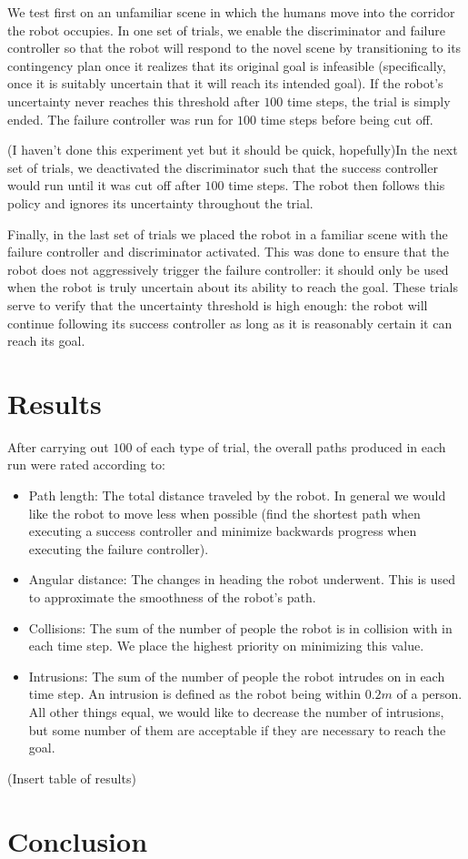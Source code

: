 \documentclass[letterpaper]{article}
\begin{document}
		We test first on an unfamiliar scene in which the humans move into the corridor the robot occupies. In one set of trials, we enable the discriminator and failure controller so that the robot will respond to the novel scene by transitioning to its contingency plan once it realizes that its original goal is infeasible (specifically, once it is suitably uncertain that it will reach its intended goal). If the robot's uncertainty never reaches this threshold after $100$ time steps, the trial is simply ended. The failure controller was run for $100$ time steps before being cut off. 
		
		(I haven't done this experiment yet but it should be quick, hopefully)In the next set of trials, we deactivated the discriminator such that the success controller would run until it was cut off after $100$ time steps. The robot then follows this policy and ignores its uncertainty throughout the trial.
		
		Finally, in the last set of trials we placed the robot in a familiar scene with the failure controller and discriminator activated. This was done to ensure that the robot does not aggressively trigger the failure controller: it should only be used when the robot is truly uncertain about its ability to reach the goal. These trials serve to verify that the uncertainty threshold is high enough: the robot will continue following its success controller as long as it is reasonably certain it can reach its goal. 
		
	\section{Results}
		After carrying out $100$ of each type of trial, the overall paths produced in each run were rated according to:
		\begin{itemize}
			\item Path length: The total distance traveled by the robot. In general we would like the robot to move less when possible (find the shortest path when executing a success controller and minimize backwards progress when executing the failure controller).
			\item Angular distance: The changes in heading the robot underwent. This is used to approximate the smoothness of the robot's path.
			\item Collisions: The sum of the number of people the robot is in collision with in each time step. We place the highest priority on minimizing this value.
			\item Intrusions: The sum of the number of people the robot intrudes on in each time step. An intrusion is defined as the robot being within $0.2m$ of a person. All other things equal, we would like to decrease the number of intrusions, but some number of them are acceptable if they are necessary to reach the goal.
		\end{itemize}
		
		(Insert table of results)
	
	\section{Conclusion}
	
	
	
	
\end{document}
